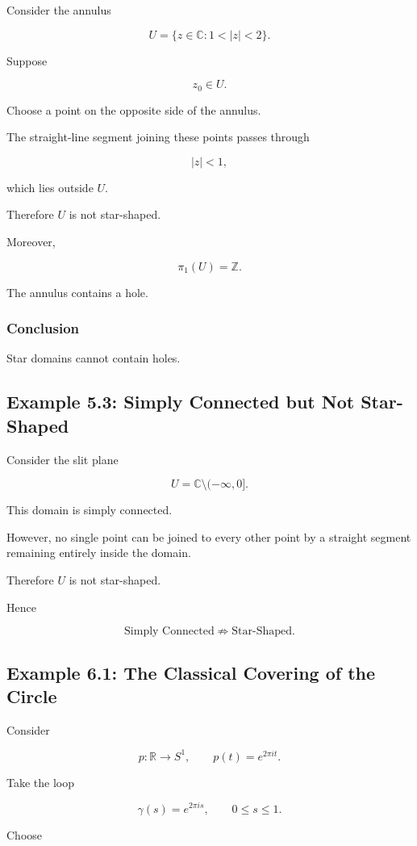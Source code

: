 \documentclass[12pt,a4paper]{article}
\theoremstyle{notespace}
\begin{document}
Consider the annulus

\[
U
=
\{z\in\mathbb C:1<|z|<2\}.
\]

Suppose

\[
z_0\in U.
\]

Choose a point on the opposite side of the annulus.

The straight-line segment joining these points passes through

\[
|z|<1,
\]

which lies outside \(U\).

Therefore \(U\) is not star-shaped.

Moreover,

\[
\pi_1(U)
=
\mathbb Z.
\]

The annulus contains a hole.

\subsubsection*{Conclusion}

Star domains cannot contain holes.

\subsection{Example 5.3: Simply Connected but Not Star-Shaped}

Consider the slit plane

\[
U
=
\mathbb C\setminus(-\infty,0].
\]

This domain is simply connected.

However, no single point can be joined to every other point by a straight segment remaining entirely inside the domain.

Therefore \(U\) is not star-shaped.

Hence

\[
\boxed{
	\text{Simply Connected}
	\not\Longrightarrow
	\text{Star-Shaped}.
}
\]

\subsection{Example 6.1: The Classical Covering of the Circle}

Consider

\[
p:\mathbb R\to S^1,
\qquad
p(t)=e^{2\pi i t}.
\]

Take the loop

\[
\gamma(s)
=
e^{2\pi i s},
\qquad
0\le s\le1.
\]

Choose
\end{document}
